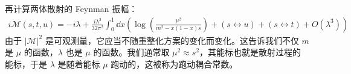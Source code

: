 再计算两体散射的 Feynman 振幅：
\begin{equation}
\begin{aligned}
i\mathcal{M}(s,t,u)=-i\lambda + \frac{i\lambda^2}{32\pi^2}\int_0^1 \dd x
\left(
\log\left(\frac{\mu^2}{m^2-x(1-x)s}\right)+
(s\leftrightarrow u)+(s\leftrightarrow t)+O(\lambda^3)
\right)
\end{aligned}
\end{equation}
由于 $|\mathcal{M}|^2$ 是可观测量，它应当不随重整化方案的变化而变化。这告诉我们不仅 $m$ 是 $\mu$ 的函数，$\lambda$ 也是 $\mu$ 的函数。我们通常取 $\mu^2\approx s^2$，其能标也就是散射过程的能标，于是 $\lambda$ 是随着能标 $\mu$ 跑动的，这被称为跑动耦合常数。